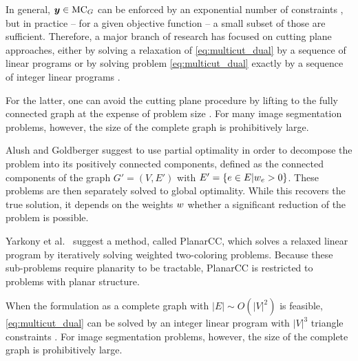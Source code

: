 In general,
$\boldsymbol y \in \text{MC}_G$ can be enforced by an exponential number of
constraints \cite{chopra_1993_mp}, but in practice
-- for a given objective function --
a small subset of those are sufficient.
Therefore, a major branch of research has focused 
on cutting plane approaches,
either by solving a relaxation of \eqref{eq:multicut_dual}
by a sequence of linear programs 
\cite{kim_2011_nips,kim_2012_ip,kappes_2013_arxiv,finley_2005_ml} 
or
by solving problem \eqref{eq:multicut_dual} exactly by a sequence
of integer linear programs
\cite{kappes_2011_emmcvpr,andres_2011_iccv,kroeger_2012_eccv,kappes_2013_arxiv,alush_2012_pami,alush_2013_simbad}.

For the latter, one can avoid the cutting plane procedure by lifting to the
fully connected graph at the expense of problem size \cite{alush_2012_pami}.
For many image segmentation problems, however, the size of the complete graph is
prohibitively large.

Alush and Goldberger \cite{alush_2012_pami,alush_2013_simbad} suggest to use
partial optimality in order to decompose the
problem into its positively connected components,
defined as the connected components of the graph $G'=(V,E')$ with
$E'=\{e\in E | w_e > 0 \}$.
These problems are then separately solved to global optimality.
While this recovers the true solution, it depends on
the weights $w$ whether 
a significant reduction of the problem is possible.

Yarkony et al.~\cite{yarkony_2012_eccv} suggest a method,
called PlanarCC,
which solves a relaxed linear program by
iteratively solving weighted two-coloring problems.
Because these sub-problems require planarity to be tractable,
PlanarCC is restricted to problems with planar structure.

When the formulation as a complete graph
with $| E | \sim O(| V|^2)$
is feasible, \eqref{eq:multicut_dual} can be solved by an integer linear program with
$| V|^3$ triangle constraints \cite{chopra_1993_mp,alush_2012_pami,finley_2005_ml}.
For image segmentation problems, however, the size of the complete graph is
prohibitively large.

%

